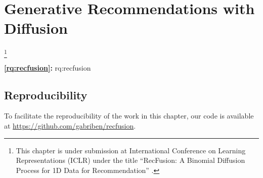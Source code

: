 
\acresetall

\chapter{Generative Recommendations with Diffusion}
\label{chapter:research-recfusion}

\footnote[]{This chapter is under submission at International Conference on Learning Representations (ICLR) under the title ``RecFusion: A Binomial Diffusion Process for 1D Data for Recommendation'' \citep{lucic2021cfgnnexplainer}.}
\acresetall


\medskip
\noindent
\textbf{\ref{rq:recfusion}:} \acl{rq:recfusion}
\medskip

\noindent



%

%
%
%
%
%
%
%
%
%



\section*{Reproducibility}
To facilitate the reproducibility of the work in this chapter, our code is available at \url{https://github.com/gabriben/recfusion}.









